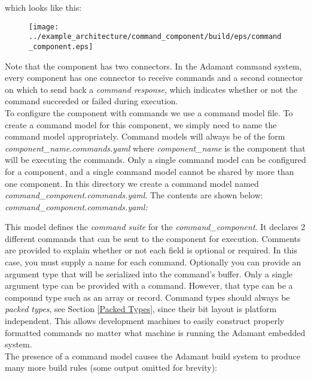 which looks like this:

\begin{figure}[H]
  \texttt{[image: ../example\_architecture/command\_component/build/eps/command\_component.eps]}
\end{figure}

Note that the component has two connectors. In the Adamant command system, every component has one connector to receive commands and a second connector on which to send back a \textit{command response}, which indicates whether or not the command succeeded or failed during execution. \\

To configure the component with commands we use a command model file. To create a command model for this component, we simply need to name the command model appropriately. Command models will always be of the form \textit{component\_name.commands.yaml} where \textit{component\_name} is the component that will be executing the commands. Only a single command model can be configured for a component, and a single command model cannot be shared by more than one component. In this directory we create a command model named \textit{command\_component.commands.yaml}. The contents are shown below: \\

\textit{command\_component.commands.yaml:}

This model defines the \textit{command suite} for the \textit{command\_component}. It declares 2 different commands that can be sent to the component for execution. Comments are provided to explain whether or not each field is optional or required. In this case, you must supply a name for each command. Optionally you can provide an argument type that will be serialized into the command's buffer. Only a single argument type can be provided with a command. However, that type can be a compound type such as an array or record. Command types should always be \textit{packed types}, see Section \ref{Packed Types}, since their bit layout is platform independent. This allows development machines to easily construct properly formatted commands no matter what machine is running the Adamant embedded system. \\

The presence of a command model causes the Adamant build system to produce many more build rules (some output omitted for brevity):

